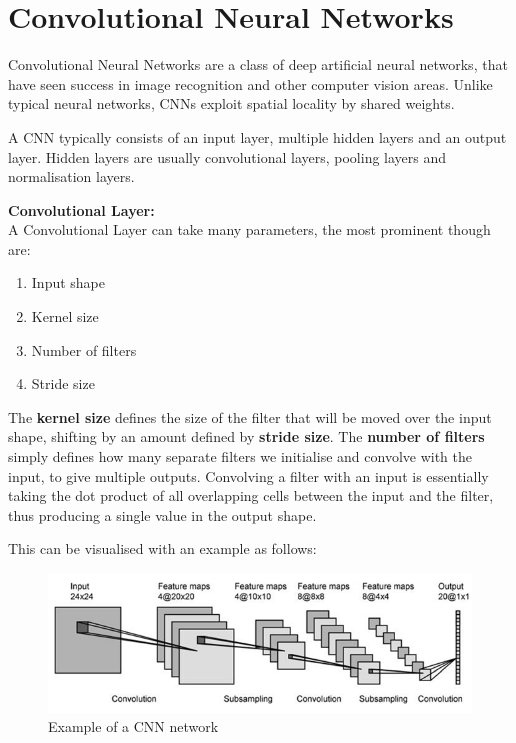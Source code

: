 \documentclass[12pt,a4paper,twoside]{report}
\begin{document}
\section{Convolutional Neural Networks}
Convolutional Neural Networks are a class of deep artificial neural networks, that have seen success in image recognition and other computer vision areas. Unlike typical neural networks, CNNs exploit spatial locality by shared weights. 

A CNN typically consists of an input layer, multiple hidden layers and an output layer. Hidden layers are usually convolutional layers, pooling layers and normalisation layers. 

\textbf{Convolutional Layer:}\\
A Convolutional Layer can take many parameters, the most prominent though are: 
\begin{enumerate}
  \item Input shape
  \item Kernel size
  \item Number of filters
  \item Stride size
\end{enumerate}

The \textbf{kernel size} defines the size of the filter that will be moved over the input shape, shifting by an amount defined by \textbf{stride size}. The \textbf{number of filters} simply defines how many separate filters we initialise and convolve with the input, to give multiple outputs. Convolving a filter with an input is essentially taking the dot product of all overlapping cells between the input and the filter, thus producing a single value in the output shape. 

This can be visualised with an example as follows:\\

\begin{figure}[H]

\centering
\includegraphics[width=\textwidth]{CNN-Example}
\caption{Example of a CNN network}
\end{figure}
\end{document}
